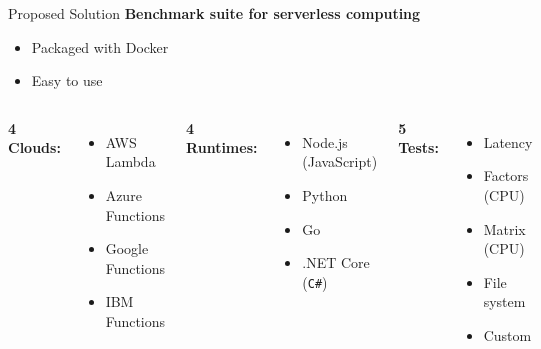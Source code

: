 \documentclass[10pt]{beamer}
\begin{document}
\begin{frame}{Proposed Solution}
\textbf{Benchmark suite for serverless computing}
	\begin{itemize}
		\item Packaged with Docker
		\item Easy to use
	\end{itemize}
	
	\vspace{0.5cm}
	
	\begin{columns}[T,onlytextwidth]
      \textbf{4 Clouds:}
      \begin{itemize}
        		\item AWS Lambda
			\item Azure Functions
			\item Google Functions
			\item IBM Functions
      \end{itemize}

      \textbf{4 Runtimes:}
      \begin{itemize}
        \item Node.js (JavaScript)
        \item Python
        \item Go
        \item .NET Core (\texttt{C\#})
      \end{itemize}

      \textbf{5 Tests:}
      \begin{itemize}
        \item Latency
        \item Factors (CPU)
        \item Matrix (CPU)
        \item File system
        \item Custom
      \end{itemize}
  \end{columns}
	
\end{frame}
\end{document}
